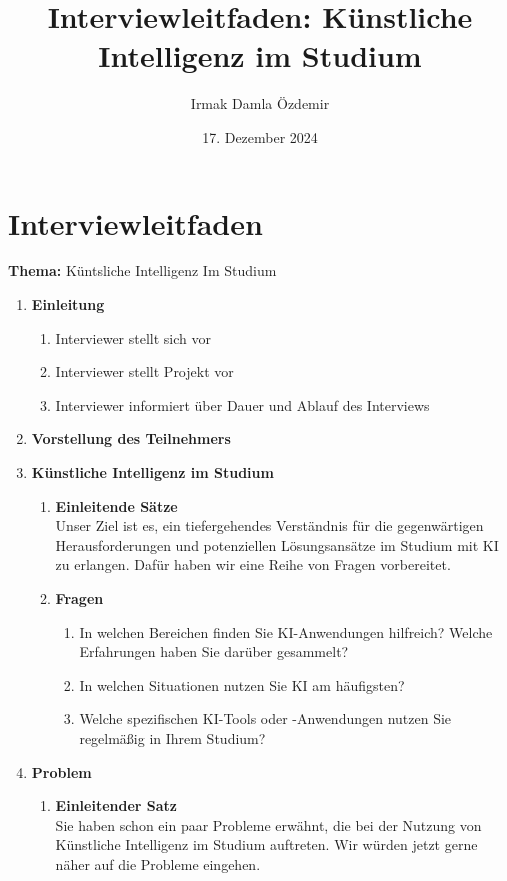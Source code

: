 \documentclass[a4paper,12pt]{article}
\title{Interviewleitfaden: Künstliche Intelligenz im Studium}
\author{Irmak Damla Özdemir}
\date{17. Dezember 2024}
\begin{document}
\maketitle

\section*{Interviewleitfaden}

\textbf{Thema:} Küntsliche Intelligenz Im Studium

\begin{enumerate}
\item \textbf{Einleitung}
\begin{enumerate}[label=\alph*)]
\item Interviewer stellt sich vor
\item Interviewer stellt Projekt vor
\item Interviewer informiert über Dauer und Ablauf des Interviews
\end{enumerate}

\item \textbf{Vorstellung des Teilnehmers}

\item \textbf{Künstliche Intelligenz im Studium}
\begin{enumerate}[label=\alph*)]
    \item \textbf{Einleitende Sätze} \\
   Unser Ziel ist es, ein tiefergehendes Verständnis für die gegenwärtigen Herausforderungen und potenziellen Lösungsansätze im Studium mit KI zu erlangen. Dafür haben wir eine Reihe von Fragen vorbereitet. \\
    
    \item \textbf{Fragen}
    \begin{enumerate}[label=\roman*)]
    \item In welchen Bereichen finden Sie KI-Anwendungen hilfreich? Welche Erfahrungen haben Sie darüber gesammelt? 
        \item  In welchen Situationen nutzen Sie KI am häufigsten?
        \item Welche spezifischen KI-Tools oder -Anwendungen nutzen Sie regelmäßig in
Ihrem Studium?
        
    \end{enumerate}
\end{enumerate}

\item \textbf{Problem}
\begin{enumerate}[label=\alph*)]
    \item \textbf{Einleitender Satz} \\
    Sie haben schon ein paar Probleme erwähnt, die bei der Nutzung von Künstliche Intelligenz im Studium auftreten. Wir würden jetzt gerne näher auf die Probleme eingehen.
    

\end{enumerate}
\end{enumerate}
\end{document}
